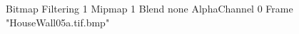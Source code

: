 {Bitmap
	{Filtering 1}
	{Mipmap 1}
	{Blend none}
	{AlphaChannel 0}
	{Frame "HouseWall05a.tif.bmp"}
}
